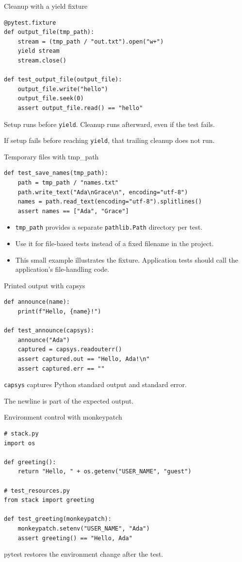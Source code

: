 \documentclass[aspectratio=169,11pt]{beamer}
\newcommand{\code}[1]{\texttt{#1}}
\begin{document}
\begin{frame}[fragile]{Cleanup with a yield fixture}
\begin{lstlisting}
@pytest.fixture
def output_file(tmp_path):
    stream = (tmp_path / "out.txt").open("w+")
    yield stream
    stream.close()

def test_output_file(output_file):
    output_file.write("hello")
    output_file.seek(0)
    assert output_file.read() == "hello"
\end{lstlisting}
Setup runs before \code{yield}. Cleanup runs afterward, even if the test fails.

If setup fails before reaching \code{yield}, that trailing cleanup does not run.
\end{frame}

\begin{frame}[fragile]{Temporary files with tmp\_path}
\begin{lstlisting}
def test_save_names(tmp_path):
    path = tmp_path / "names.txt"
    path.write_text("Ada\nGrace\n", encoding="utf-8")
    names = path.read_text(encoding="utf-8").splitlines()
    assert names == ["Ada", "Grace"]
\end{lstlisting}
\begin{itemize}
\item \code{tmp\_path} provides a separate \code{pathlib.Path} directory per test.
\item Use it for file-based tests instead of a fixed filename in the project.
\item This small example illustrates the fixture. Application tests should call the application's file-handling code.
\end{itemize}
\end{frame}

\begin{frame}[fragile]{Printed output with capsys}
\begin{lstlisting}
def announce(name):
    print(f"Hello, {name}!")

def test_announce(capsys):
    announce("Ada")
    captured = capsys.readouterr()
    assert captured.out == "Hello, Ada!\n"
    assert captured.err == ""
\end{lstlisting}
\code{capsys} captures Python standard output and standard error.

The newline is part of the expected output.
\end{frame}

\begin{frame}[fragile]{Environment control with monkeypatch}
\begin{lstlisting}
# stack.py
import os

def greeting():
    return "Hello, " + os.getenv("USER_NAME", "guest")

# test_resources.py
from stack import greeting

def test_greeting(monkeypatch):
    monkeypatch.setenv("USER_NAME", "Ada")
    assert greeting() == "Hello, Ada"
\end{lstlisting}
pytest restores the environment change after the test.
\end{frame}
\end{document}
